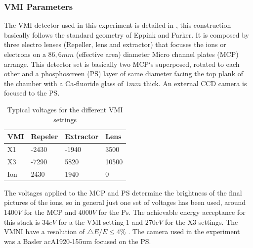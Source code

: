 \subsubsection{VMI Parameters}

The VMI detector used in this experiment is detailed in \cite{schomas_compact_2017}, this construction basically follows the standard geometry of Eppink and Parker\cite{eppink_velocity_1997}. It is composed by three electro lenses (Repeller, lens and extractor) that focuses the ions or electrons on a $86,6mm$ (effective area) diameter Micro channel plates (MCP) arrange. This detector set is basically  two MCP`s superposed,  rotated to each other and a phosphoscreen (PS) layer of same diameter facing the top plank of the chamber with a Ca-fluoride glass of $1mm$ thick. An external CCD camera is focused to the PS. 

\begin{table}[]
\centering
\begin{tabular}{|l|l|l|l|}
\hline
\rowcolor[HTML]{EFEFEF} 
VMI & Repeler & Extractor & Lens  \\ \hline
X1  & -2430   & -1940     & 3500  \\ \hline
X3  & -7290   & 5820      & 10500 \\ \hline
Ion & 2430    & 1940      & 0     \\ \hline
\end{tabular}
\caption{Typical voltages for the different VMI settings}
\label{tab:vmisettings}
\end{table}

The voltages applied to the MCP and PS determine the brightness of the final pictures of the ions, so in general just one set of voltages has been used, around $1400V$ for the MCP and $4000V$ for the Ps. The achievable energy acceptance for this stack is $34eV$ for a the VMI setting 1 and $270 eV$ for the X3 settings. The VMNI have a resolution of $\bigtriangleup E / E\leq 4\%$ \cite{schomas_compact_2017}. The camera used in the experiment was a Basler acA1920-155um focused on the PS.

